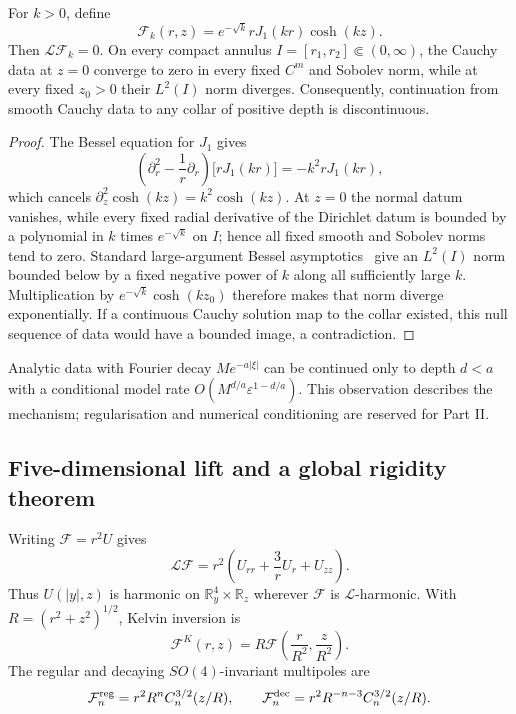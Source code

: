 \begin{theorem}
\label{thm:bessel-hadamard}
For $k>0$, define
$$
\mathcal F_k(r,z)=e^{-\sqrt{k}}rJ_1(kr)\cosh(kz).
$$
Then $\mathcal L\mathcal F_k=0$. On every compact annulus
$I=[r_1,r_2]\Subset(0,\infty)$, the Cauchy data at $z=0$ converge to zero
in every fixed $C^m$ and Sobolev norm, while at every fixed $z_0>0$ their
$L^2(I)$ norm diverges. Consequently, continuation from smooth Cauchy data
to any collar of positive depth is discontinuous.
\end{theorem}

\begin{proof}
The Bessel equation for $J_1$ gives
$$
\left(\partial_r^2-\frac1r\partial_r\right)
\bigl[rJ_1(kr)\bigr]=-k^2rJ_1(kr),
$$
which cancels $\partial_z^2\cosh(kz)=k^2\cosh(kz)$. At $z=0$ the normal
datum vanishes, while every fixed radial derivative of the Dirichlet datum
is bounded by a polynomial in $k$ times $e^{-\sqrt{k}}$ on $I$; hence all
fixed smooth and Sobolev norms tend to zero. Standard large-argument Bessel
asymptotics~\cite{NISTDLMF} give an $L^2(I)$ norm bounded below by a fixed
negative power of $k$ along all sufficiently large $k$. Multiplication by
$e^{-\sqrt{k}}\cosh(kz_0)$ therefore makes that norm diverge exponentially.
If a continuous Cauchy solution map to the collar existed, this null
sequence of data would have a bounded image, a contradiction.
\end{proof}

Analytic data with Fourier decay $Me^{-a|\xi|}$ can be continued only to
depth $d<a$ with a conditional model rate
$O(M^{d/a}\varepsilon^{1-d/a})$. This observation describes the mechanism;
regularisation and numerical conditioning are reserved for Part II.

\subsection{Five-dimensional lift and a global rigidity theorem}

\begin{proposition}
\label{prop:five-dimensional-lift}
Writing $\mathcal F=r^2U$ gives
\begin{equation}
\mathcal L\mathcal F
=r^2\left(U_{rr}+\frac3rU_r+U_{zz}\right).
\label{eq:five-dimensional-lift}
\end{equation}
Thus $U(|y|,z)$ is harmonic on $\mathbb R^4_y\times\mathbb R_z$ wherever
$\mathcal F$ is $\mathcal L$-harmonic. With
$R=(r^2+z^2)^{1/2}$, Kelvin inversion is
$$
\mathcal F^K(r,z)
=R\mathcal F\left(\frac r{R^2},\frac z{R^2}\right).
$$
The regular and decaying $SO(4)$-invariant multipoles are
$$
\mathcal F_n^{\rm reg}=r^2R^nC_n^{3/2}(z/R),
\qquad
\mathcal F_n^{\rm dec}=r^2R^{-n-3}C_n^{3/2}(z/R).
$$
\end{proposition}

